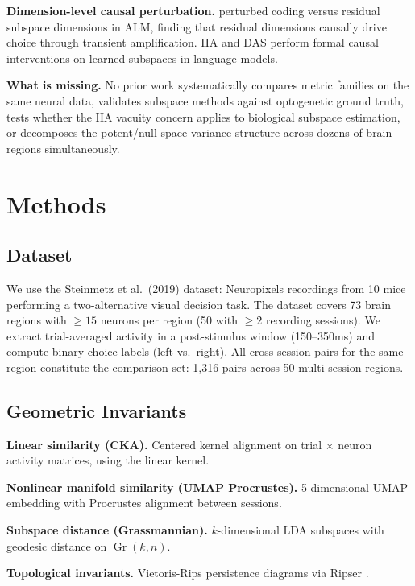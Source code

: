\documentclass{article}
\begin{document}
\textbf{Dimension-level causal perturbation.} \citet{pereira2025residual} perturbed coding versus residual subspace dimensions in ALM, finding that residual dimensions causally drive choice through transient amplification. IIA \citep{geiger2024finding} and DAS \citep{geiger2024causal} perform formal causal interventions on learned subspaces in language models.

\textbf{What is missing.} No prior work systematically compares metric families on the same neural data, validates subspace methods against optogenetic ground truth, tests whether the IIA vacuity concern applies to biological subspace estimation, or decomposes the potent/null space variance structure across dozens of brain regions simultaneously.

\section{Methods}

\subsection{Dataset}

We use the Steinmetz et al.\ (2019) dataset: Neuropixels recordings from 10 mice performing a two-alternative visual decision task. The dataset covers 73 brain regions with $\geq 15$ neurons per region (50 with $\geq 2$ recording sessions). We extract trial-averaged activity in a post-stimulus window (150--350ms) and compute binary choice labels (left vs.\ right). All cross-session pairs for the same region constitute the comparison set: 1,316 pairs across 50 multi-session regions.

\subsection{Geometric Invariants}

\textbf{Linear similarity (CKA).} Centered kernel alignment \citep{kornblith2019similarity} on trial $\times$ neuron activity matrices, using the linear kernel.

\textbf{Nonlinear manifold similarity (UMAP Procrustes).} 5-dimensional UMAP embedding \citep{mcinnes2018umap} with Procrustes alignment between sessions.

\textbf{Subspace distance (Grassmannian).} $k$-dimensional LDA subspaces with geodesic distance on $\operatorname{Gr}(k, n)$.

\textbf{Topological invariants.} Vietoris-Rips persistence diagrams via Ripser \citep{bauer2021ripser}.
\end{document}
